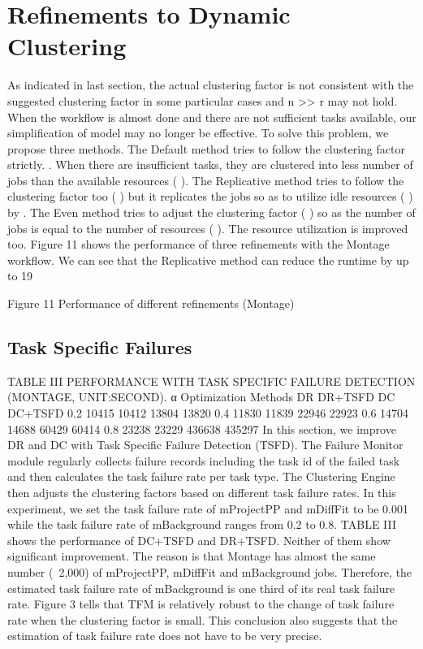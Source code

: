 \documentclass{IOS-Book-Article}
\begin{document}
\section{Refinements to Dynamic Clustering}
As indicated in last section, the actual clustering factor is not consistent with the suggested clustering factor in some particular cases and n >> r may not hold. When the workflow is almost done and there are not sufficient tasks available, our simplification of model may no longer be effective. To solve this problem, we propose three methods. 
The Default method tries to follow the clustering factor strictly.  . When there are insufficient tasks, they are clustered into less number of jobs than the available resources ( ). 
The Replicative method tries to follow the clustering factor too ( ) but it replicates the jobs so as to utilize idle resources ( ) by  .
The Even method tries to adjust the clustering factor ( ) so as the number of jobs is equal to the number of resources ( ).  The resource utilization is improved too. 
Figure 11 shows the performance of three refinements with the Montage workflow. We can see that the Replicative method can reduce the runtime by up to 19%
 
Figure 11	Performance of different refinements (Montage)
\subsection{Task Specific Failures}
TABLE III	PERFORMANCE WITH TASK SPECIFIC FAILURE DETECTION (MONTAGE, UNIT:SECOND). 
α 	Optimization Methods
	DR	DR+TSFD	DC	DC+TSFD
0.2	10415	10412	13804	13820
0.4	11830	11839	22946	22923
0.6	14704	14688	60429	60414
0.8	23238	23229	436638	435297
In this section, we improve DR and DC with Task Specific Failure Detection (TSFD). The Failure Monitor module regularly collects failure records including the task id of the failed task and then calculates the task failure rate per task type. The Clustering Engine then adjusts the clustering factors based on different task failure rates. In this experiment, we set the task failure rate of mProjectPP and mDiffFit to be 0.001 while the task failure rate of mBackground ranges from 0.2 to 0.8. TABLE III shows the performance of DC+TSFD and DR+TSFD. Neither of them show significant improvement. The reason is that Montage has almost the same number (~2,000) of mProjectPP, mDiffFit and mBackground jobs. Therefore, the estimated task failure rate of mBackground is one third of its real task failure rate. Figure 3 tells that TFM is relatively robust to the change of task failure rate when the clustering factor is small. This conclusion also suggests that the estimation of task failure rate does not have to be very precise. 
\end{document}
